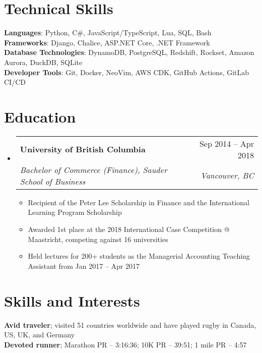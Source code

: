 \documentclass[letterpaper,11pt]{article}
\makeatletter
\newcommand{\resumeItem}[1]{
  \item\small{
    {#1 \vspace{-2pt}}
  }
}
\newcommand{\resumeSubheading}[4]{
  \vspace{-2pt}\item
    \begin{tabular*}{0.97\textwidth}[t]{l@{\extracolsep{\fill}}r}
      \textbf{#1} & #2 \\
      \textit{\small#3} & \textit{\small #4} \\
    \end{tabular*}\vspace{-7pt}
}
\newcommand{\resumeSubHeadingListStart}{\begin{itemize}[leftmargin=0.15in, label={}]}
\newcommand{\resumeSubHeadingListEnd}{\end{itemize}}
\newcommand{\resumeItemListStart}{\begin{itemize}}
\newcommand{\resumeItemListEnd}{\end{itemize}\vspace{-5pt}}
\makeatother
\begin{document}
%
\section{Technical Skills}
 \begin{itemize}[leftmargin=0.15in, label={}]
    \small{\item{
     \textbf{Languages}{: Python, C#, JavaScript/TypeScript, Lua, SQL, Bash}\\
     \textbf{Frameworks}{: Django, Chalice, ASP.NET Core, .NET Framework}\\
     \textbf{Database Technologies}{: DynamoDB, PostgreSQL, Redshift, Rockset, Amazon Aurora, DuckDB, SQLite}\\
     \textbf{Developer Tools}{: Git, Docker, NeoVim, AWS CDK, GitHub Actions, GitLab CI/CD}
    }}
 \end{itemize}


\section{Education}
  \resumeSubHeadingListStart
    \resumeSubheading
      {University of British Columbia}{Sep 2014 -- Apr 2018}
      {Bachelor of Commerce (Finance), Sauder School of Business}{Vancouver, BC}
      \resumeItemListStart
        \resumeItem{Recipient of the Peter Lee Scholarship in Finance and the International Learning Program Scholarship}
        \resumeItem{Awarded 1st place at the 2018 International Case Competition @ Maastricht, competing against 16 universities}
        \resumeItem{Held lectures for 200+ students as the Managerial Accounting Teaching Assistant from Jan 2017 -- Apr 2017}
      \resumeItemListEnd
  \resumeSubHeadingListEnd

\section{Skills and Interests}
 \begin{itemize}[leftmargin=0.15in, label={}]
    \small{\item{
     \textbf{Avid traveler}{; visited 51 countries worldwide and have played rugby in Canada, US, UK, and Germany}\\
     \textbf{Devoted runner}{; Marathon PR – 3:16:36; 10K PR – 39:51; 1 mile PR – 4:57}
    }}
 \end{itemize}

\end{document}
